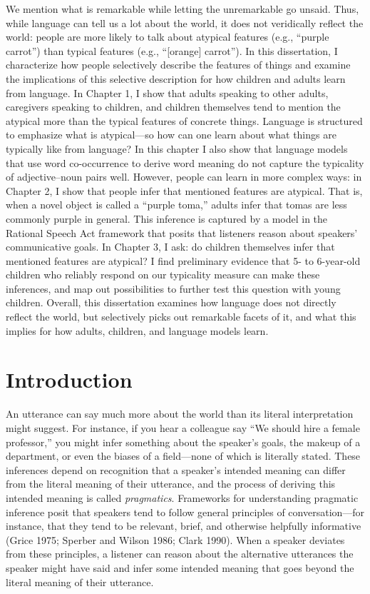 \documentclass{ucetd}
\begin{document}
\abstract
We mention what is remarkable while letting the unremarkable go unsaid. Thus, while language can tell us a lot about the world, it does not veridically reflect the world: people are more likely to talk about atypical features (e.g., ``purple carrot'') than typical features (e.g., ``[orange] carrot''). In this dissertation, I characterize how people selectively describe the features of things and examine the implications of this selective description for how children and adults learn from language. In Chapter 1, I show that adults speaking to other adults, caregivers speaking to children, and children themselves tend to mention the atypical more than the typical features of concrete things. Language is structured to emphasize what is atypical—so how can one learn about what things are typically like from language? In this chapter I also show that language models that use word co-occurrence to derive word meaning do not capture the typicality of adjective–noun pairs well. However, people can learn in more complex ways: in Chapter 2, I show that people infer that mentioned features are atypical. That is, when a novel object is called a ``purple toma,'' adults infer that tomas are less commonly purple in general. This inference is captured by a model in the Rational Speech Act framework that posits that listeners reason about speakers' communicative goals. In Chapter 3, I ask: do children themselves infer that mentioned features are atypical? I find preliminary evidence that 5- to 6-year-old children who reliably respond on our typicality measure can make these inferences, and map out possibilities to further test this question with young children. Overall, this dissertation examines how language does not directly reflect the world, but selectively picks out remarkable facets of it, and what this implies for how adults, children, and language models learn.

\mainmatter
\hypertarget{introduction}{%
\chapter*{Introduction}\label{introduction}}

An utterance can say much more about the world than its literal
interpretation might suggest. For instance, if you hear a colleague say
``We should hire a female professor,'' you might infer something about
the speaker's goals, the makeup of a department, or even the biases of a
field---none of which is literally stated. These inferences depend on
recognition that a speaker's intended meaning can differ from the
literal meaning of their utterance, and the process of deriving this
intended meaning is called \emph{pragmatics}. Frameworks for
understanding pragmatic inference posit that speakers tend to follow
general principles of conversation---for instance, that they tend to be
relevant, brief, and otherwise helpfully informative (Grice 1975;
Sperber and Wilson 1986; Clark 1990). When a speaker deviates from these
principles, a listener can reason about the alternative utterances the
speaker might have said and infer some intended meaning that goes beyond
the literal meaning of their utterance.
\end{document}
